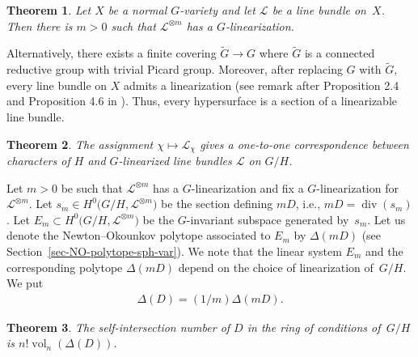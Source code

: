 \documentclass[10pt,a4paper]{amsart}
\def \vol{\operatorname{vol}}
\numberwithin{equation}{section}
\newtheorem{Th}{Theorem}[section]
\theoremstyle{definition}
\begin{document}
\begin{Th} \label{th-exist-G-lin}
Let $X$ be a normal $G$-variety and let $\mathcal{L}$ be a line bundle on~$X$. Then there is $m>0$ such that $\mathcal{L}^{\otimes m}$ has a $G$-linearization.
\end{Th}

Alternatively, there exists a finite covering $\tilde{G} \to G$ where $\tilde{G}$ is a connected reductive group with trivial Picard group. Moreover, after replacing $G$ with $\tilde{G}$, every line bundle on $X$ admits a linearization (see remark after Proposition 2.4 and Proposition 4.6 in \cite{KKLV}). Thus, every hypersurface is a section of a linearizable line bundle.

\begin{Th} \label{th-G-lin-G/H}
The assignment $\chi \mapsto \mathcal{L}_\chi$ gives a one-to-one correspondence between characters of $H$ and $G$-linearized line bundles $\mathcal{L}$ on $G/H$.
\end{Th}

Let $m>0$ be such that ${\mathcal L}^{\otimes m}$ has a $G$-linearization and fix a $G$-linearization for ${\mathcal L}^{\otimes m}$. Let $s_m \in H^0\big(G/H, {\mathcal L}^{\otimes m}\big)$ be the section defining $mD$, i.e., $mD = \operatorname{div}(s_m)$. Let $E_m \subset H^0\big(G/H, {\mathcal L}^{\otimes m}\big)$ be the $G$-invariant subspace generated by~$s_m$. Let us denote the Newton--Okounkov polytope associated to $E_m$ by $\Delta(mD)$ (see Section~\ref{sec-NO-polytope-sph-var}). We note that the linear system $E_m$ and the corresponding polytope $\Delta(mD)$ depend on the choice of linearization of~$G/H$. We put
\begin{gather*} \Delta(D) = (1/m) \Delta(mD).\end{gather*}


\begin{Th} \label{th-main}The self-intersection number of $D$ in the ring of conditions of~$G/H$ is \linebreak $n! \vol_n(\Delta(D))$.
\end{Th}
\end{document}
